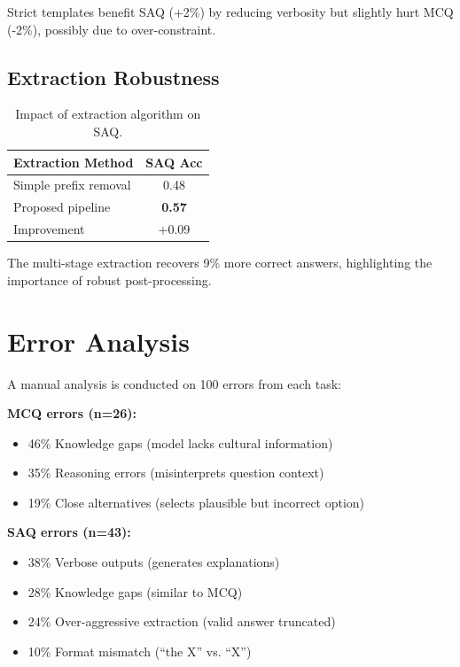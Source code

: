 \documentclass[11pt,a4paper,twocolumn]{article}
\begin{document}
Strict templates benefit SAQ (+2\%) by reducing verbosity but slightly hurt MCQ (-2\%), possibly due to over-constraint.

\subsection{Extraction Robustness}

\begin{table}[h]
\centering
\small
\begin{tabular}{lc}
\toprule
\textbf{Extraction Method} & \textbf{SAQ Acc} \\
\midrule
Simple prefix removal & 0.48 \\
Proposed pipeline & \textbf{0.57} \\
\midrule
Improvement & +0.09 \\
\bottomrule
\end{tabular}
\caption{Impact of extraction algorithm on SAQ.}
\label{tab:ablation_extraction}
\end{table}

The multi-stage extraction recovers 9\% more correct answers, highlighting the importance of robust post-processing.

\section{Error Analysis}

A manual analysis is conducted on 100 errors from each task:

\textbf{MCQ errors (n=26):}
\begin{itemize}
\item 46\% Knowledge gaps (model lacks cultural information)
\item 35\% Reasoning errors (misinterprets question context)
\item 19\% Close alternatives (selects plausible but incorrect option)
\end{itemize}

\textbf{SAQ errors (n=43):}
\begin{itemize}
\item 38\% Verbose outputs (generates explanations)
\item 28\% Knowledge gaps (similar to MCQ)
\item 24\% Over-aggressive extraction (valid answer truncated)
\item 10\% Format mismatch (``the X'' vs. ``X'')
\end{itemize}
\end{document}
